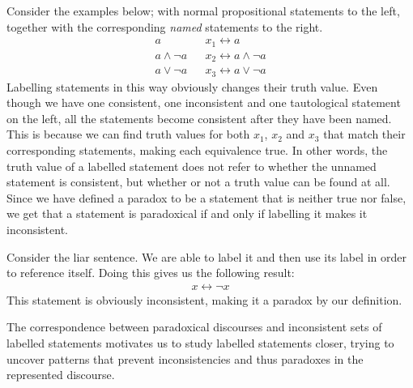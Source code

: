 Consider the examples below; with normal propositional statements to the left, together with the corresponding \textit{named} statements to the right.
\begin{align}
  a               && x_1 \leftrightarrow a\\
  a \wedge \neg a && x_2 \leftrightarrow a \wedge \neg a\\
  a \vee \neg a   && x_3 \leftrightarrow a \vee \neg a
\end{align}
Labelling statements in this way obviously changes their truth value.
Even though we have one consistent, one inconsistent and one tautological statement on the left, all the statements become consistent after they have been named.
This is because we can find truth values for both $x_1$, $x_2$ and $x_3$ that match their corresponding statements, making each equivalence true.
In other words, the truth value of a labelled statement does not refer to whether the unnamed statement is consistent, but whether or not a truth value can be found at all.
Since we have defined a paradox to be a statement that is neither true nor false, we get that a statement is paradoxical if and only if labelling it makes it inconsistent.

Consider the liar sentence.
We are able to label it and then use its label in order to reference itself.
Doing this gives us the following result:
\begin{align}
  x \leftrightarrow \neg x
\end{align}
This statement is obviously inconsistent, making it a paradox by our definition.

The correspondence between paradoxical discourses and inconsistent sets of labelled statements motivates us to study labelled statements closer, trying to uncover patterns that prevent inconsistencies and thus paradoxes in the represented discourse.

